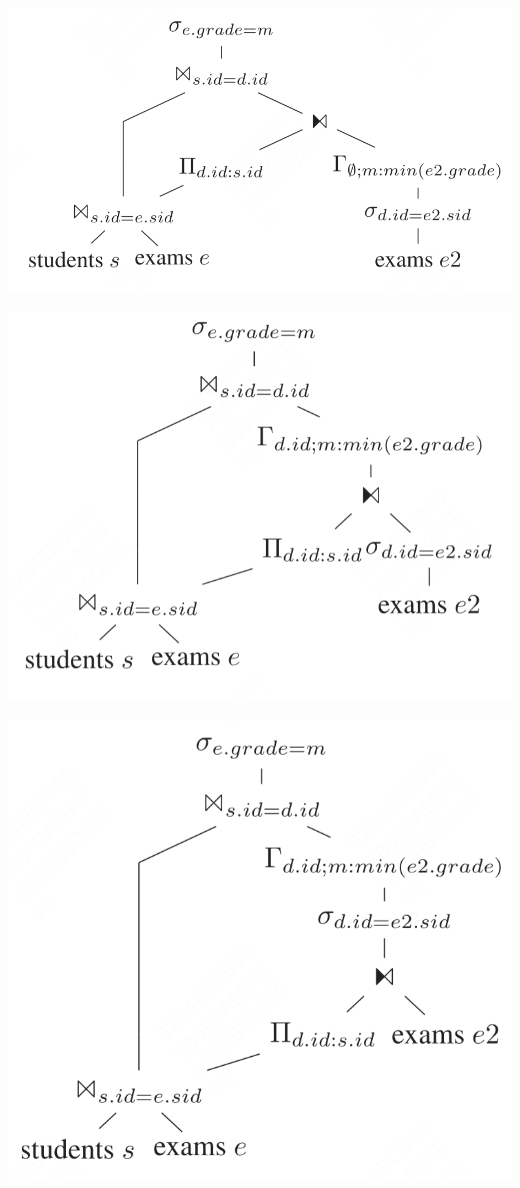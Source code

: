\documentclass[11pt]{article}
\begin{document}
\begin{center}
\includegraphics[width=.6\textwidth]{../../images/papers/87.png}
\end{center}


\begin{center}
\includegraphics[width=.6\textwidth]{../../images/papers/88.png}
\end{center}

\begin{center}
\includegraphics[width=.6\textwidth]{../../images/papers/89.png}
\end{center}
\end{document}
